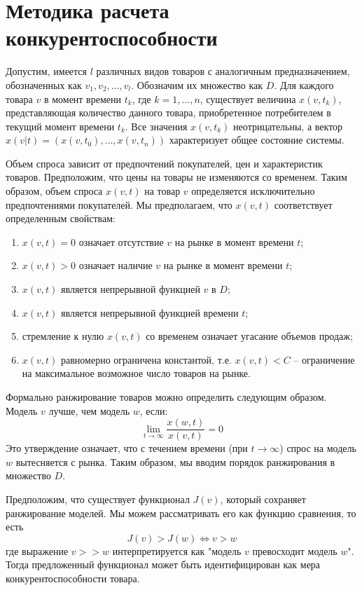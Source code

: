 \documentclass[14pt, a4paper]{extarticle}
\begin{document}
  \section{Методика расчета конкурентоспособности}

  Допустим, имеется \( l \) различных видов товаров с аналогичным предназначением, обозначенных как \( v_1, v_2, \ldots, v_l \). Обозначим их множество как \( D \). Для каждого товара \( v \) в момент времени \( t_k \), где \( k = 1, \ldots, n \), существует величина \( x(v, t_k) \), представляющая количество данного товара, приобретенное потребителем в текущий момент времени \( t_k \). Все значения \( x(v, t_k) \) неотрицательны, а вектор \( x(v|t) = (x(v, t_0), \ldots, x(v, t_n)) \) характеризует общее состояние системы.
  
  Объем спроса зависит от предпочтений покупателей, цен и характеристик товаров. Предположим, что цены на товары не изменяются со временем. Таким образом, объем спроса \( x(v, t) \) на товар \( v \) определяется исключительно предпочтениями покупателей. Мы предполагаем, что \( x(v, t) \) соответствует определенным свойствам:
  \begin{enumerate}
      \item \( x(v, t) = 0 \) означает отсутствие \( v \) на рынке в момент времени \( t \);
      \item \( x(v, t) > 0 \) означает наличие \( v \) на рынке в момент времени \( t \);
      \item \( x(v, t) \) является непрерывной функцией \( v \) в \( D \);
      \item \( x(v, t) \) является непрерывной функцией времени \( t \);
      \item стремление к нулю \( x(v, t) \) со временем означает угасание объемов продаж;
      \item \( x(v, t) \) равномерно ограничена константой, т.е. \( x(v, t) < C \) – ограничение на максимальное возможное число товаров на рынке.
  \end{enumerate}
  
  Формально ранжирование товаров можно определить следующим образом. Модель \( v \) лучше, чем модель \( w \), если:
  \[
  \lim_{t \to \infty} \frac{x(w, t)}{x(v, t)} = 0
  \]
  Это утверждение означает, что с течением времени (при \( t \to \infty \)) спрос на модель \( w \) вытесняется с рынка. Таким образом, мы вводим порядок ранжирования в множество \( D \).
  
  Предположим, что существует функционал \( J(v) \), который сохраняет ранжирование моделей. Мы можем рассматривать его как функцию сравнения, то есть
  \[
  J(v) > J(w) \Leftrightarrow v > w
  \]
  где выражение \( v >> w \) интерпретируется как "модель \( v \) превосходит модель \( w \)". Тогда предложенный функционал может быть идентифицирован как мера конкурентоспособности товара.
  
\end{document}
